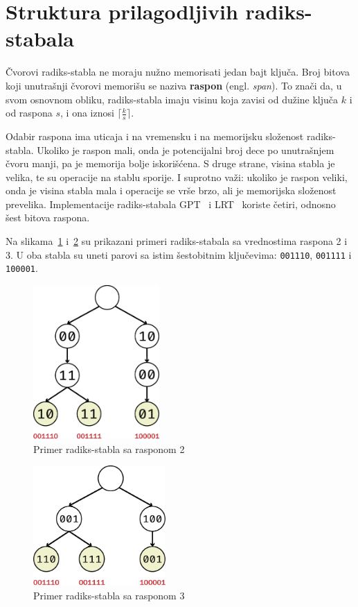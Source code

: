 \documentclass[12pt,oneside]{memoir}
\begin{document}
\section{Struktura prilagodljivih radiks-stabala}

Čvorovi radiks-stabla ne moraju nužno memorisati jedan bajt ključa.
Broj bitova koji unutrašnji čvorovi memorišu se naziva \textbf{raspon} (engl. \emph{span}).
To znači da, u svom osnovnom obliku, radiks-stabla imaju visinu koja zavisi od
dužine ključa $k$ i od raspona $s$, i ona iznosi $ \lceil \frac{k}{s} \rceil $.

Odabir raspona ima uticaja i na vremensku i na memorijsku složenost
radiks-stabla. Ukoliko je raspon mali, onda je potencijalni broj dece po
unutrašnjem čvoru manji, pa je memorija bolje iskorišćena. S druge strane,
visina stabla je velika, te su operacije na stablu sporije.
I suprotno važi: ukoliko je raspon veliki,
onda je visina stabla mala i operacije se vrše brzo, ali je memorijska složenost
prevelika. Implementacije radiks-stabala GPT~\cite{gpt} i LRT~\cite{lrt}
koriste četiri, odnosno šest bitova raspona.

Na slikama~\ref{fig:radix_span2}
i~\ref{fig:radix_span3} su prikazani primeri radiks-stabala sa vrednostima
raspona 2 i 3. U oba stabla su uneti parovi sa istim šestobitnim ključevima:
\texttt{001110}, \texttt{001111} i \texttt{100001}.


\begin{figure}[!h]
  \centering
  \includegraphics[width=0.43\textwidth]{radix_span2.eps}
  \caption{Primer radiks-stabla sa rasponom 2}
  \label{fig:radix_span2}
\end{figure}

\begin{figure}[!h]
  \centering
  \includegraphics[width=0.45\textwidth]{radix_span3.eps}
  \caption{Primer radiks-stabla sa rasponom 3}
  \label{fig:radix_span3}
\end{figure}
\end{document}
